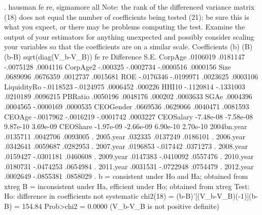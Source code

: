 . hausman fe re, sigmamore all
{\smallskip}
Note: the rank of the differenced variance matrix (18) does not equal the
        number of coefficients being tested (21); be sure this is what you
        expect, or there may be problems computing the test.  Examine the
        output of your estimators for anything unexpected and possibly consider
        scaling your variables so that the coefficients are on a similar scale.
{\smallskip}
                  Coefficients 
             {\VBAR}      (b)          (B)            (b-B)     sqrt(diag(V_b-V_B))
             {\VBAR}       fe           re         Difference          S.E.
     CorpAge {\VBAR}    .0106019     .0181147       -.0075128        .0004116
    CorpAge2 {\VBAR}    -.000325    -.0002734       -.0000516        .0000156
        Size {\VBAR}    .0689096     .0676359        .0012737        .0015681
         ROE {\VBAR}   -.0176346    -.0199971        .0023625        .0003106
LiquidityR{\tytilde}o {\VBAR}   -.0118523    -.0124975        .0006452         .000226
       HHI10 {\VBAR}   -.1120814    -.1331003        .0210189        .0096215
     PBRatio {\VBAR}    .0050196     .0048176         .000202        .0003633
        SGAe {\VBAR}    .0004396     .0004565       -.0000169        .0000535
   CEOGender {\VBAR}    .0669536     .0629066        .0040471        .0081593
      CEOAge {\VBAR}   -.0017962    -.0016219       -.0001742        .0003227
   CEOSalary {\VBAR}   -7.48e-08    -7.58e-08        9.87e-10        3.69e-09
    CEOShare {\VBAR}   -1.97e-09    -2.66e-09        6.90e-10        2.70e-10
 2004bn.year {\VBAR}    .0135711     .0042706        .0093005               .
   2005.year {\VBAR}     .032335     .0137249        .0186101               .
   2006.year {\VBAR}    .0342641     .0059687        .0282953               .
   2007.year {\VBAR}    .0196853     -.017442        .0371273               .
   2008.year {\VBAR}    .0159427    -.0301181        .0460608               .
   2009.year {\VBAR}    .0147383    -.0410092        .0557476               .
   2010.year {\VBAR}    .0180731    -.0474253        .0654984               .
   2011.year {\VBAR}    .0031531    -.0722948        .0754479               .
   2012.year {\VBAR}    .0002649    -.0855381        .0858029               .
                           b = consistent under Ho and Ha; obtained from xtreg
            B = inconsistent under Ha, efficient under Ho; obtained from xtreg
{\smallskip}
    Test:  Ho:  difference in coefficients not systematic
{\smallskip}
                 chi2(18) = (b-B)'[(V_b-V_B){\caret}(-1)](b-B)
                          =      154.84
                Prob>chi2 =      0.0000
                (V_b-V_B is not positive definite)
